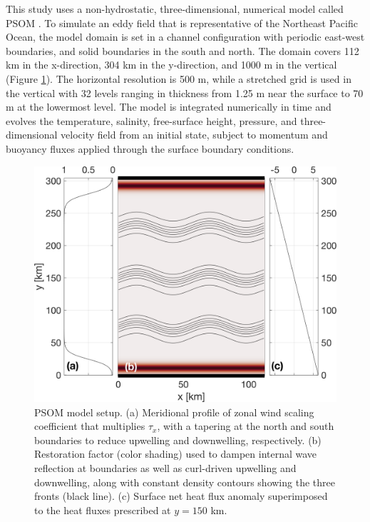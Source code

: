 \documentclass[draft,linenumbers]{agujournal2018}
\begin{document}
This study uses a non-hydrostatic, three-dimensional, numerical model called PSOM \citep{Mahadevan_1996a,Mahadevan_1996b}. To simulate an eddy field that is representative of the Northeast Pacific Ocean, the model domain is set in a channel configuration with periodic east-west boundaries, and solid boundaries in the south and north. The domain covers 112 km in the x-direction, 304 km in the y-direction, and 1000 m in the vertical (Figure \ref{fig: model_domain}). The horizontal resolution is 500 m, while a stretched grid is used in the vertical with 32 levels ranging in thickness from 1.25 m near the surface to 70 m at the lowermost level. The model is integrated numerically in time and evolves the temperature, salinity, free-surface height, pressure, and three-dimensional velocity field from an initial state, subject to momentum and buoyancy fluxes applied through the surface boundary conditions.

\begin{figure}[ht]
	\centering
	\includegraphics[width = .6\linewidth]{figures/Fig1_model_domain}
	\caption{PSOM model setup. (a) Meridional profile of zonal wind scaling coefficient that multiplies $\tau_x$, with a tapering at the north and south boundaries to reduce upwelling and downwelling, respectively. (b) Restoration factor (color shading) used to dampen internal wave reflection at boundaries as well as curl-driven upwelling and downwelling, along with constant density contours showing the three fronts (black line). (c) Surface net heat flux anomaly superimposed to the heat fluxes prescribed at $y = 150$ km.}
	\label{fig: model_domain}
\end{figure}
\end{document}
